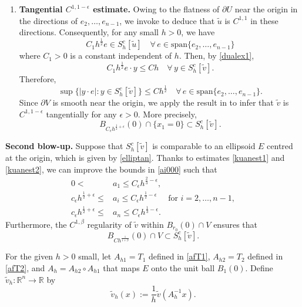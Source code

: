 \documentclass[11pt]{amsart}
\theoremstyle{plain}
\newcommand{\0}{\textbf{0}}
\numberwithin{equation}{section}
\numberwithin{equation}{section}
\numberwithin{figure}{section}
\begin{document}
\begin{enumerate}
    \item \textbf{Tangential $C^{1, 1-\epsilon}$ estimate.} 
    Owing to the flatness of \( \partial U \) near the origin in the directions of \( e_2, \ldots, e_{n-1} \), we invoke \cite[Corollary 1.1]{C96} to deduce that \( \tilde{u} \) is \( C^{1,1} \) in these directions. Consequently, for any small \( h>0 \), we have
\[
C_1h^{\frac{1}{2}}e \in S_h^c[\tilde{u}]\quad  \forall\, e \in \text{span}\{e_2,\ldots,e_{n-1}\}
\]
where \( C_1>0 \) is a constant independent of \( h \).
Then, by \eqref{dualex1},  
\[
C_1h^{\frac{1}{2}}e \cdot y \leq Ch \quad \forall\, y \in S_h^c[\tilde{v}].
\]
Therefore,
\begin{equation}\label{kuanest1}
\sup\{|y \cdot e| : y \in S_h^c[\tilde{v}]\} \leq Ch^{\frac{1}{2}} \quad  \forall\, e \in \text{span}\{e_2,\ldots,e_{n-1}\}. 
\end{equation}
Since \( \partial V \) is smooth near the origin, we apply the result in \cite[Lemma 3.1]{CLW1} to infer that \( \tilde{v} \) is \( C^{1,1-\epsilon} \) tangentially for any $\epsilon>0$. More precisely, 
\begin{equation}\label{kuanest2}
B_{C_\epsilon h^{\frac{1}{2}+\epsilon}}(0) \cap \{x_1=0\} \subset S_h^c[\tilde{v}].
\end{equation}
  \end{enumerate}


\vskip 20pt
{\bf Second blow-up.} 
Suppose that \(S_h^c[\tilde v]\) is comparable to an ellipsoid \(E\) centred at the origin, which is given by \eqref{elliptan}. 
Thanks to estimates \eqref{kuanest1} and \eqref{kuanest2}, we can improve the bounds in \eqref{ai000} such that 
\begin{align}
0 < & a_1 \leq C_\epsilon h^{\frac{2}{3}-\epsilon}, \nonumber \\
c_\epsilon h^{\frac{1}{2}+\epsilon} \leq & a_i \leq C_\epsilon h^{\frac{1}{2}-\epsilon} \quad \text{ for } i = 2, \ldots, n-1, \label{ai1} \\ 
c_\epsilon h^{\frac{1}{2}+\epsilon} \leq & a_n \leq C_\epsilon h^{\frac13-\epsilon}. \nonumber
\end{align}
Furthermore, the \(C^{1,\beta}\) regularity of \(\tilde{v}\) within \(B_{r_0}(0) \cap V\) ensures that
\begin{equation}\label{ai2}
B_{Ch^{\frac{1}{1+\beta}}}(0) \cap V \subset S_h^c[\tilde{v}].
\end{equation}

For the given $h>0$ small, let $A_{h1}=T_1$ defined in \eqref{afT1}, $A_{h2}=T_2$ defined in \eqref{afT2}, and $A_h = A_{h2} \circ A_{h1}$
that maps \(E\) onto the unit ball \(B_1(0)\). 
Define \(\tilde v_h: \mathbb{R}^n \rightarrow \mathbb{R}\) by 
\[\tilde v_h(x) := \frac{1}{h} \tilde v(A_h^{-1}x).\] 
\end{document}
